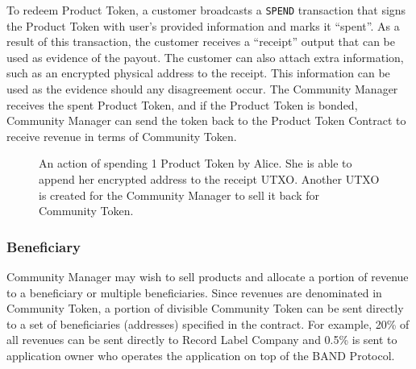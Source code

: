 \documentclass[letterpaper,11pt]{article}
\begin{document}
To redeem Product Token, a customer broadcasts a {\tt SPEND} transaction that signs the Product Token with user's provided information and marks it ``spent''. As a result of this transaction, the customer receives a ``receipt'' output that can be used as evidence of the payout. The customer can also attach extra information, such as an encrypted physical address to the receipt. This information can be used as the evidence should any disagreement occur. The Community Manager receives the spent Product Token, and if the Product Token is bonded, Community Manager can send the token back to the Product Token Contract to receive revenue in terms of Community Token.

\begin{figure}[!h]
\centering
{}
\caption{An action of spending 1 Product Token by Alice. She is able to append her encrypted address to the receipt UTXO. Another UTXO is created for the Community Manager to sell it back for Community Token.}
\label{fig:utxo-stake}
\end{figure}

\subsubsection{Beneficiary}
Community Manager may wish to sell products and allocate a portion of revenue to a beneficiary or multiple beneficiaries. Since revenues are denominated in Community Token, a portion of divisible Community Token can be sent directly to a set of beneficiaries (addresses) specified in the contract. For example, 20\% of all revenues can be sent directly to Record Label Company and 0.5\% is sent to application owner who operates the application on top of the BAND Protocol.
\end{document}
